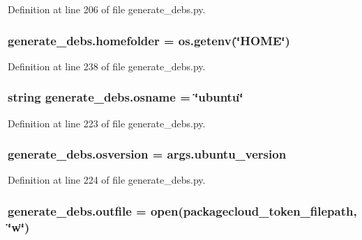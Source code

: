 Definition at line 206 of file generate\+\_\+debs.\+py.

\subsubsection[{\texorpdfstring{homefolder}{homefolder}}]{\setlength{\rightskip}{0pt plus 5cm}generate\+\_\+debs.\+homefolder = os.\+getenv(\char`\"{}H\+O\+ME\char`\"{})}\hypertarget{namespacegenerate__debs_aeb83979be2939a8059435a906a91f682}{}\label{namespacegenerate__debs_aeb83979be2939a8059435a906a91f682}


Definition at line 238 of file generate\+\_\+debs.\+py.

\subsubsection[{\texorpdfstring{osname}{osname}}]{\setlength{\rightskip}{0pt plus 5cm}string generate\+\_\+debs.\+osname = \char`\"{}ubuntu\char`\"{}}\hypertarget{namespacegenerate__debs_ad06322332de29cb27a40152d0cccc2ca}{}\label{namespacegenerate__debs_ad06322332de29cb27a40152d0cccc2ca}


Definition at line 223 of file generate\+\_\+debs.\+py.

\subsubsection[{\texorpdfstring{osversion}{osversion}}]{\setlength{\rightskip}{0pt plus 5cm}generate\+\_\+debs.\+osversion = args.\+ubuntu\+\_\+version}\hypertarget{namespacegenerate__debs_afd02fe6ead63bc5db5d3c3b9eb973b62}{}\label{namespacegenerate__debs_afd02fe6ead63bc5db5d3c3b9eb973b62}


Definition at line 224 of file generate\+\_\+debs.\+py.

\subsubsection[{\texorpdfstring{outfile}{outfile}}]{\setlength{\rightskip}{0pt plus 5cm}generate\+\_\+debs.\+outfile = open({\bf packagecloud\+\_\+token\+\_\+filepath}, \char`\"{}w\char`\"{})}\hypertarget{namespacegenerate__debs_aa1faa039b35b72ee44dc6f106ad12911}{}\label{namespacegenerate__debs_aa1faa039b35b72ee44dc6f106ad12911}


